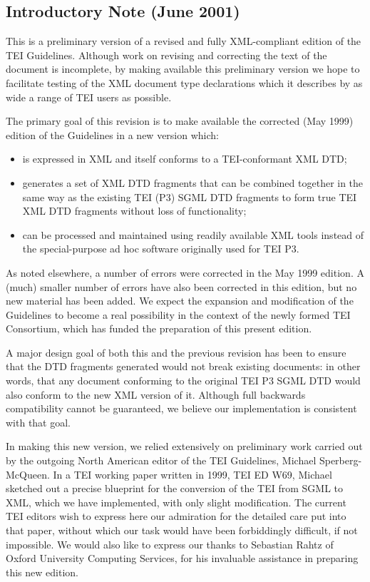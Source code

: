 \subsection[{Introductory Note (June 2001)}]{Introductory Note (June 2001)}\label{PPF2}\par
This is a preliminary version of a revised and fully XML-compliant edition of the TEI Guidelines. Although work on revising and correcting the text of the document is incomplete, by making available this preliminary version we hope to facilitate testing of the XML document type declarations which it describes by as wide a range of TEI users as possible. \par
The primary goal of this revision is to make available the corrected (May 1999) edition of the Guidelines in a new version which: \begin{itemize}
\item is expressed in XML and itself conforms to a TEI-conformant XML DTD;
\item generates a set of XML DTD fragments that can be combined together in the same way as the existing TEI (P3) SGML DTD fragments to form true TEI XML DTD fragments without loss of functionality;
\item can be processed and maintained using readily available XML tools instead of the special-purpose ad hoc software originally used for TEI P3.
\end{itemize}  As noted elsewhere, a number of errors were corrected in the May 1999 edition. A (much) smaller number of errors have also been corrected in this edition, but no new material has been added. We expect the expansion and modification of the Guidelines to become a real possibility in the context of the newly formed TEI Consortium, which has funded the preparation of this present edition.\par
A major design goal of both this and the previous revision has been to ensure that the DTD fragments generated would not break existing documents: in other words, that any document conforming to the original TEI P3 SGML DTD would also conform to the new XML version of it. Although full backwards compatibility cannot be guaranteed, we believe our implementation is consistent with that goal. \par
In making this new version, we relied extensively on preliminary work carried out by the outgoing North American editor of the TEI Guidelines, Michael Sperberg-McQueen. In a TEI working paper written in 1999, TEI ED W69, Michael sketched out a precise blueprint for the conversion of the TEI from SGML to XML, which we have implemented, with only slight modification. The current TEI editors wish to express here our admiration for the detailed care put into that paper, without which our task would have been forbiddingly difficult, if not impossible. We would also like to express our thanks to Sebastian Rahtz of Oxford University Computing Services, for his invaluable assistance in preparing this new edition.\par

